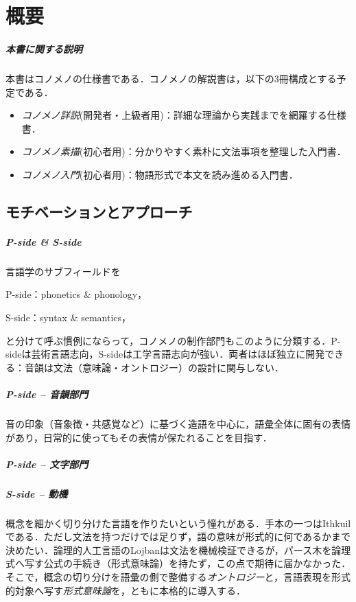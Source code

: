 \documentclass[../main-detail.tex]{subfiles}
\begin{document}
\chapter{概要}
\paragraph{本書に関する説明}
本書はコノメノの仕様書である．コノメノの解説書は，以下の3冊構成とする予定である．
\begin{itemize}
    \item \emph{コノメノ詳説}(開発者・上級者用)：詳細な理論から実践までを網羅する仕様書．
    \item \emph{コノメノ素描}(初心者用)：分かりやすく素朴に文法事項を整理した入門書．
    \item \emph{コノメノ入門}(初心者用)：物語形式で本文を読み進める入門書．
\end{itemize}

\section{モチベーションとアプローチ}
\paragraph{P-side \& S-side} 言語学のサブフィールドを
\begin{itemize*}
    \item[] P-side：phonetics \& phonology，
    \item[] S-side：syntax \& semantics，
\end{itemize*}
と分けて呼ぶ慣例にならって，コノメノの制作部門もこのように分類する．P-sideは芸術言語志向，S-sideは工学言語志向が強い．両者はほぼ独立に開発できる：音韻は文法（意味論・オントロジー）の設計に関与しない．

\paragraph{P-side -- 音韻部門} 音の印象（音象徴・共感覚など）に基づく造語を中心に，語彙全体に固有の表情があり，日常的に使ってもその表情が保たれることを目指す．

\paragraph{P-side -- 文字部門}

\paragraph{S-side -- 動機}
概念を細かく切り分けた言語を作りたいという憧れがある．手本の一つはIthkuilである．ただし文法を持つだけでは足りず，語の意味が形式的に何であるかまで決めたい．論理的人工言語のLojbanは文法を機械検証できるが，パース木を論理式へ写す公式の手続き（形式意味論）を持たず\cite{cll}，この点で期待に届かなかった．そこで，概念の切り分けを語彙の側で整備する\emph{オントロジー}と，言語表現を形式的対象へ写す\emph{形式意味論}を，ともに本格的に導入する．
\end{document}
